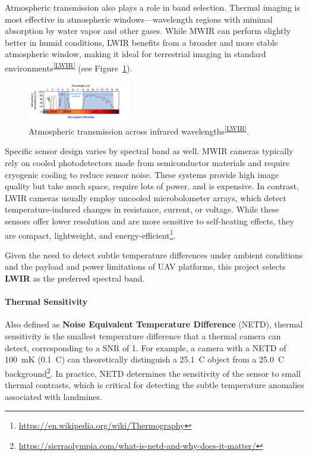 Atmospheric transmission also plays a role in band selection. Thermal imaging is most effective in atmospheric windows—wavelength regions with minimal absorption by water vapor and other gases. While \gls{MWIR} can perform slightly better in humid conditions, \gls{LWIR} benefits from a broader and more stable atmospheric window, making it ideal for terrestrial imaging in standard environments\textsuperscript{\ref{LWIR}} (see Figure~\ref{fig:atmos_window}).


\begin{figure}[H]
    \centering
    \includegraphics[width=0.4\textwidth]{figs/Huirui/atmospheric_window_plot.png}
    \caption[Atmospheric transmission]{Atmospheric transmission across infrared wavelengths\textsuperscript{\ref{LWIR}}.}
    \label{fig:atmos_window}
\end{figure}


Specific sensor design varies by spectral band as well. \gls{MWIR} cameras typically rely on cooled photodetectors made from semiconductor materials and require cryogenic cooling to reduce sensor noise. These systems provide high image quality but take much space, require lots of power, and is expensive. In contrast, \gls{LWIR} cameras usually employ uncooled microbolometer arrays, which detect temperature-induced changes in resistance, current, or voltage. While these sensors offer lower resolution and are more sensitive to self-heating effects, they are compact, lightweight, and energy-efficient\footnote{\url{https://en.wikipedia.org/wiki/Thermography}}.

Given the need to detect subtle temperature differences under ambient conditions and the payload and power limitations of \gls{UAV} platforms, this project selects \textbf{\gls{LWIR}} as the preferred spectral band.


\paragraph{Thermal Sensitivity}

Also defined as \textbf{Noise Equivalent Temperature Difference} (NETD), thermal sensitivity is the smallest temperature difference that a thermal camera can detect, corresponding to a \gls{SNR} of 1. For example, a camera with a \gls{NETD} of 100~mK (0.1~\textdegree C) can theoretically distinguish a 25.1~\textdegree C object from a 25.0~\textdegree C background\footnote{\url{https://sierraolympia.com/what-is-netd-and-why-does-it-matter/}}. In practice, \gls{NETD} determines the sensitivity of the sensor to small thermal contrasts, which is critical for detecting the subtle temperature anomalies associated with landmines.

